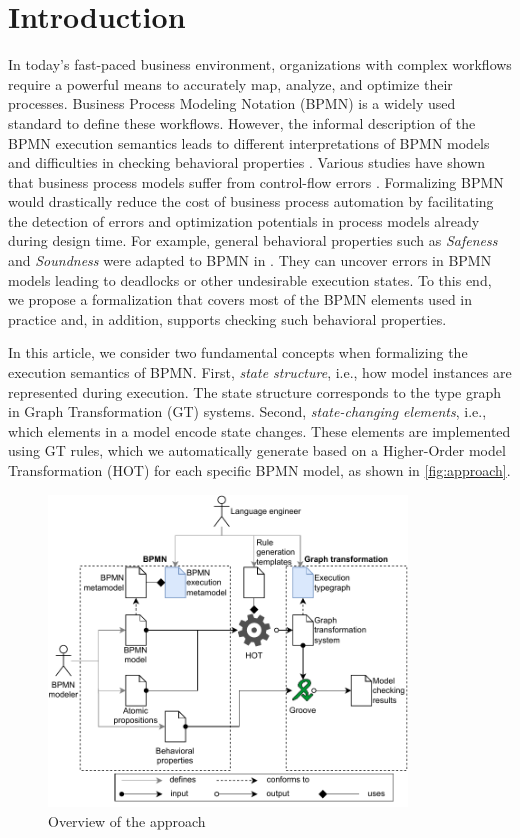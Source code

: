 \documentclass{lmcs} %
\begin{document}
\section{Introduction}
In today's fast-paced business environment, organizations with complex workflows require a powerful means to accurately map, analyze, and optimize their processes. 
Business Process Modeling Notation (BPMN) \cite{objectmanagementgroupBusinessProcessModel2013} is a widely used standard to define these workflows.
However, the informal description of the BPMN execution semantics leads to different interpretations of BPMN models and difficulties in checking behavioral properties \cite{corradiniFormalApproachAnalysis2021}.
Various studies have shown that business process models suffer from control-flow errors \cite{mendlingEmpiricalStudiesProcess2009}.
Formalizing BPMN would drastically reduce the cost of business process automation by facilitating the detection of errors and optimization potentials in process models already during design time.
For example, general behavioral properties such as \textit{Safeness} and \textit{Soundness} were adapted to BPMN in \cite{corradiniClassificationBPMNCollaborations2018}.
They can uncover errors in BPMN models leading to deadlocks or other undesirable execution states.
To this end, we propose a formalization that covers most of the BPMN elements used in practice and, in addition, supports checking such behavioral properties.

In this article, we consider two fundamental concepts when formalizing the execution semantics of BPMN.
First, \textit{state structure}, i.e., how model instances are represented during execution.
The state structure corresponds to the type graph in Graph Transformation (GT) systems.
Second, \textit{state-changing elements}, i.e., which elements in a model encode state changes.
These elements are implemented using GT rules, which we automatically generate based on a Higher-Order model Transformation (HOT) \cite{tisiUseHigherOrderModel2009} for each specific BPMN model, as shown in \autoref{fig:approach}.

\begin{figure}[ht]
    \centering
    \includegraphics[width=0.85\textwidth]{images/bpmn_semantics-overview.pdf}
    \caption{Overview of the approach}
    \label{fig:approach}
\end{figure}
\end{document}
